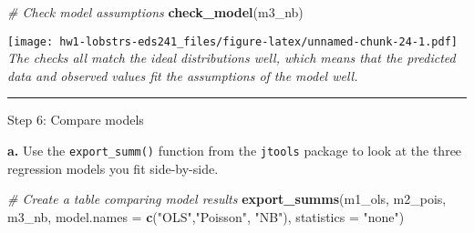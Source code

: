 \documentclass[
]{article}
\newenvironment{Shaded}{\begin{snugshade}}{\end{snugshade}}
\newcommand{\AttributeTok}[1]{\textcolor[rgb]{0.13,0.29,0.53}{#1}}
\newcommand{\CommentTok}[1]{\textcolor[rgb]{0.56,0.35,0.01}{\textit{#1}}}
\newcommand{\FunctionTok}[1]{\textcolor[rgb]{0.13,0.29,0.53}{\textbf{#1}}}
\newcommand{\NormalTok}[1]{#1}
\newcommand{\StringTok}[1]{\textcolor[rgb]{0.31,0.60,0.02}{#1}}
\begin{document}
\begin{Shaded}
\begin{Highlighting}[]
\CommentTok{\# Check model assumptions}
\FunctionTok{check\_model}\NormalTok{(m3\_nb)}
\end{Highlighting}
\end{Shaded}

\texttt{[image: hw1-lobstrs-eds241\_files/figure-latex/unnamed-chunk-24-1.pdf]}
\emph{The checks all match the ideal distributions well, which means
that the predicted data and observed values fit the assumptions of the
model well.}

\begin{center}\rule{0.5\linewidth}{0.5pt}\end{center}

Step 6: Compare models

\textbf{a.} Use the \texttt{export\_summ()} function from the
\texttt{jtools} package to look at the three regression models you fit
side-by-side.

\begin{Shaded}
\begin{Highlighting}[]
\CommentTok{\# Create a table comparing model results}
\FunctionTok{export\_summs}\NormalTok{(m1\_ols, m2\_pois, m3\_nb,}
             \AttributeTok{model.names =} \FunctionTok{c}\NormalTok{(}\StringTok{"OLS"}\NormalTok{,}\StringTok{"Poisson"}\NormalTok{, }\StringTok{"NB"}\NormalTok{),}
             \AttributeTok{statistics =} \StringTok{"none"}\NormalTok{)}
\end{Highlighting}
\end{Shaded}

 
  \providecommand{\huxb}[2]{\arrayrulecolor[RGB]{#1}\global\arrayrulewidth=#2pt}
  \providecommand{\huxvb}[2]{\color[RGB]{#1}\vrule width #2pt}
  \providecommand{\huxtpad}[1]{\rule{0pt}{#1}}
  \providecommand{\huxbpad}[1]{\rule[-#1]{0pt}{#1}}
\end{document}

